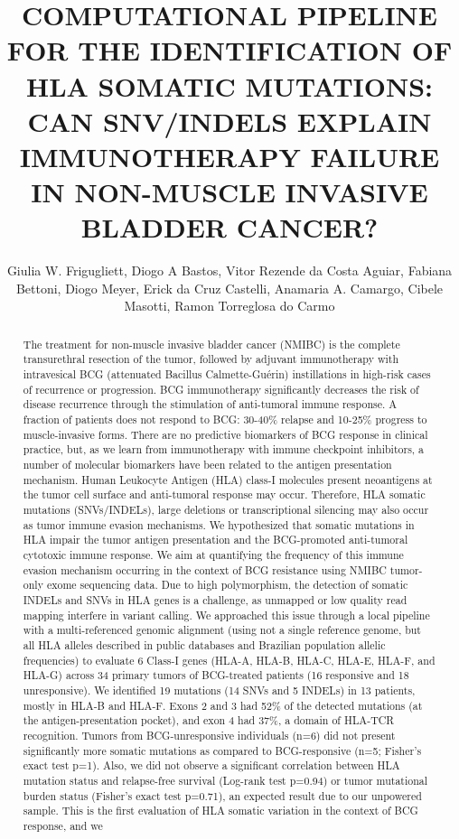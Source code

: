 \documentclass[twoside]{article}
\title{\vspace{-15mm}\fontsize{24pt}{10pt}\selectfont\textbf{ COMPUTATIONAL PIPELINE FOR THE IDENTIFICATION OF HLA SOMATIC MUTATIONS: CAN SNV/INDELS EXPLAIN IMMUNOTHERAPY FAILURE IN NON-MUSCLE INVASIVE BLADDER CANCER? }} %
\author{ Giulia W. Frigugliett,  Diogo A Bastos,  Vitor Rezende da Costa Aguiar,  Fabiana Bettoni,  Diogo Meyer,  Erick da Cruz Castelli,  Anamaria A. Camargo,  Cibele Masotti,  Ramon Torreglosa do Carmo }
\affil{ Instituto S\'{\i}rio-Liban\^es de Ensino e Pesquisa,  HSL Hospital S\'{\i}rio liban\^es }
\date{}
\begin{document}
  
  
  \maketitle %
  
  
  \thispagestyle{fancy} %
  
  
  \begin{abstract}
  The treatment for non-muscle invasive bladder cancer (NMIBC) is the complete transurethral resection of the tumor,  followed by adjuvant immunotherapy with intravesical BCG (attenuated Bacillus Calmette-Gu\'erin) instillations in high-risk cases of recurrence or progression. BCG immunotherapy significantly decreases the risk of disease recurrence through the stimulation of anti-tumoral immune response. A fraction of patients does not respond to BCG: 30-40\% relapse and 10-25\% progress to muscle-invasive forms. There are no predictive biomarkers of BCG response in clinical practice,  but,  as we learn from immunotherapy with immune checkpoint inhibitors,  a number of molecular biomarkers have been related to the antigen presentation mechanism. Human Leukocyte Antigen (HLA) class-I molecules present neoantigens at the tumor cell surface and anti-tumoral response may occur. Therefore,  HLA somatic mutations (SNVs/INDELs),  large deletions or transcriptional silencing may also occur as tumor immune evasion mechanisms. We hypothesized that somatic mutations in HLA impair the tumor antigen presentation and the BCG-promoted anti-tumoral cytotoxic immune response. We aim at quantifying the frequency of this immune evasion mechanism occurring in the context of BCG resistance using NMIBC tumor-only exome sequencing data. Due to high polymorphism,  the detection of somatic INDELs and SNVs in HLA genes is a challenge,  as unmapped or low quality read mapping interfere in variant calling. We approached this issue through a local pipeline with a multi-referenced genomic alignment (using not a single reference genome,  but all HLA alleles described in public databases and Brazilian population allelic frequencies) to evaluate 6 Class-I genes (HLA-A,  HLA-B,  HLA-C,  HLA-E,  HLA-F,  and HLA-G) across 34 primary tumors of BCG-treated patients (16 responsive and 18 unresponsive). We identified 19 mutations (14 SNVs and 5 INDELs) in 13 patients,  mostly in HLA-B and HLA-F. Exons 2 and 3 had 52\% of the detected mutations (at the antigen-presentation pocket),  and exon 4 had 37\%,  a domain of HLA-TCR recognition. Tumors from BCG-unresponsive individuals (n=6) did not present significantly more somatic mutations as compared to BCG-responsive (n=5; Fisher’s exact test p=1). Also,  we did not observe a significant correlation between HLA mutation status and relapse-free survival (Log-rank test p=0.94) or tumor mutational burden status (Fisher’s exact test p=0.71),  an expected result due to our unpowered sample. This is the first evaluation of HLA somatic variation in the context of BCG response,  and we 
\end{abstract}
\end{document}
